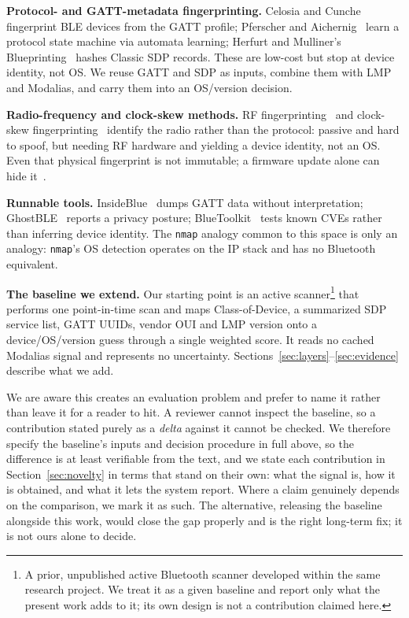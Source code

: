 \documentclass[conference]{IEEEtran}
\begin{document}
\textbf{Protocol- and GATT-metadata fingerprinting.} Celosia and
Cunche~\cite{celosia2019gatt} fingerprint BLE devices from the GATT
profile; Pferscher and Aichernig~\cite{pferscher2022automata} learn a
protocol state machine via automata learning; Herfurt and Mulliner's
Blueprinting~\cite{herfurt2004blueprinting} hashes Classic SDP records.
These are low-cost but stop at device identity, not OS. We reuse GATT and SDP
as inputs, combine them with LMP and Modalias, and carry them into an
OS/version decision.

\textbf{Radio-frequency and clock-skew methods.} RF
fingerprinting~\cite{santanacruz2024jsdivergence,rusins2023rffingerprint,helluylafont2020sdr}
and clock-skew fingerprinting~\cite{lanze2012clockskew} identify the radio
rather than the protocol: passive and hard to spoof, but needing RF hardware
and yielding a device identity, not an OS. Even that physical fingerprint is
not immutable; a firmware update alone can hide it~\cite{ucsd2024firmware}.

\textbf{Runnable tools.} InsideBlue~\cite{insideblue} dumps GATT data without
interpretation; GhostBLE~\cite{ghostble} reports a privacy posture;
BlueToolkit~\cite{bluetoolkit} tests known CVEs rather than inferring device
identity. The \texttt{nmap} analogy common to this space is only an analogy:
\texttt{nmap}'s OS detection operates on the IP stack and has no Bluetooth
equivalent.

\textbf{The baseline we extend.} Our starting point is an active
scanner\footnote{A prior, unpublished active Bluetooth scanner developed
within the same research project. We treat it as a given baseline and
report only what the present work adds to it; its own design is not a
contribution claimed here.} that performs one point-in-time scan and maps Class-of-Device, a summarized
SDP service list, GATT UUIDs, vendor OUI and LMP version onto a
device/OS/version guess through a single weighted score. It reads no cached
Modalias signal and represents no uncertainty.
Sections~\ref{sec:layers}--\ref{sec:evidence} describe what we add.

We are aware this creates an evaluation problem and prefer to name it rather
than leave it for a reader to hit. A reviewer cannot inspect the baseline, so
a contribution stated purely as a \emph{delta} against it cannot be checked.
We therefore specify the baseline's inputs and decision procedure in full
above, so the difference is at least verifiable from the text, and we state
each contribution in Section~\ref{sec:novelty} in terms that stand on their
own: what the signal is, how it is obtained, and what it lets the system
report. Where a claim genuinely depends on the comparison, we mark it as
such. The alternative, releasing the baseline alongside this work, would
close the gap properly and is the right long-term fix; it is not ours alone
to decide.
\end{document}
